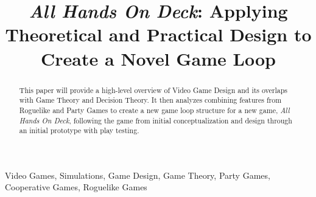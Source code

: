 \title{\textit{All Hands On Deck}: Applying Theoretical and Practical Design to Create a Novel Game Loop\\
}

\author{
}

\maketitle

\begin{abstract}
This paper will provide a high-level overview of Video Game
Design and its overlaps with Game Theory and Decision Theory.
It then analyzes combining features from Roguelike and Party
Games to create a new game loop structure for a new
game, \textit{All Hands On Deck}, following the game from
initial conceptualization and design through an initial
prototype with play testing.
\end{abstract}

\begin{IEEEkeywords}
Video Games, Simulations, Game Design, Game Theory, Party Games, Cooperative Games, Roguelike Games
\end{IEEEkeywords}